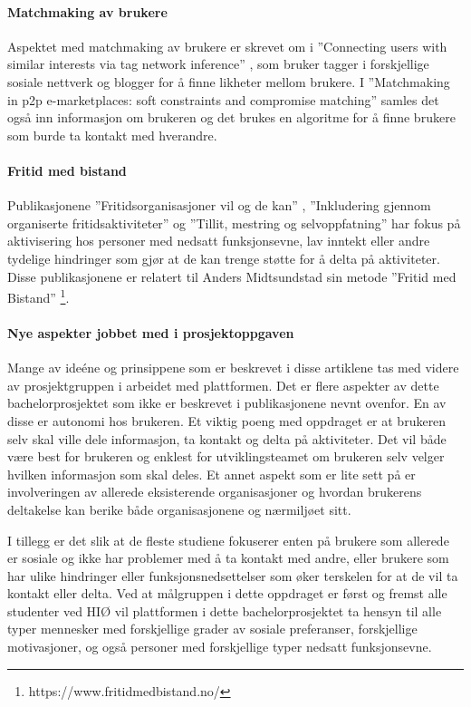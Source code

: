 \paragraph{Matchmaking av brukere}
Aspektet med matchmaking av brukere er skrevet om i ''Connecting users with similar interests via tag network inference'' \cite{TAGNETWORK:8:CIKM11}, som bruker tagger i forskjellige sosiale nettverk og blogger for å finne likheter mellom brukere. I ''Matchmaking in p2p e-marketplaces: soft constraints and compromise matching'' \cite{MATCHMAKING:9:ICEC10} samles det også inn informasjon om brukeren og det brukes en algoritme for å finne brukere som burde ta kontakt med hverandre.

\paragraph{Fritid med bistand}
Publikasjonene ''Fritidsorganisasjoner vil og de kan'' \cite{FRITID:12}, ''Inkludering gjennom organiserte fritidsaktiviteter'' \cite{INKLUDERING:11} og ''Tillit, mestring og selvoppfatning'' \cite{TILLIT:13} har fokus på aktivisering hos personer med nedsatt funksjonsevne, lav inntekt eller andre tydelige hindringer som gjør at de kan trenge støtte for å delta på aktiviteter. Disse publikasjonene er relatert til Anders Midtsundstad sin metode ''Fritid med Bistand'' \footnote{https://www.fritidmedbistand.no/}. 
\paragraph{Nye aspekter jobbet med i prosjektoppgaven}
Mange av ideéne og prinsippene som er beskrevet i disse artiklene tas med videre av prosjektgruppen i arbeidet med plattformen. Det er flere aspekter av dette bachelorprosjektet som ikke er beskrevet i publikasjonene nevnt ovenfor. En av disse er autonomi hos brukeren. Et viktig poeng med oppdraget er at brukeren selv skal ville dele informasjon, ta kontakt og delta på aktiviteter. Det vil både være best for brukeren og enklest for utviklingsteamet om brukeren selv velger hvilken informasjon som skal deles. Et annet aspekt som er lite sett på er involveringen av allerede eksisterende organisasjoner og hvordan brukerens deltakelse kan berike både organisasjonene og nærmiljøet sitt. 

I tillegg er det slik at de fleste studiene fokuserer enten på brukere som allerede er sosiale og ikke har problemer med å ta kontakt med andre, eller brukere som har ulike hindringer eller funksjonsnedsettelser som øker terskelen for at de vil ta kontakt eller delta. Ved at målgruppen i dette oppdraget er først og fremst alle studenter ved HIØ vil plattformen i dette bachelorprosjektet ta hensyn til alle typer mennesker med forskjellige grader av sosiale preferanser, forskjellige motivasjoner, og også personer med forskjellige typer nedsatt funksjonsevne.

